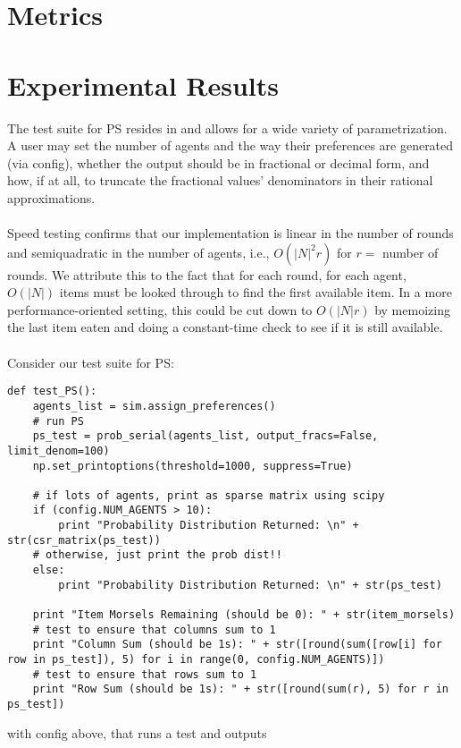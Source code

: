 \documentclass[12pt]{article}
\begin{document}
\section*{Metrics}
\section*{Experimental Results}

The test suite for PS resides in  and allows for a wide variety of parametrization. A user may set the number of agents and the way their preferences are generated (via config), whether the output should be in fractional or decimal form, and how, if at all, to truncate the fractional values' denominators in their rational approximations.\\\\Speed testing confirms that our implementation is linear in the number of rounds and semiquadratic in the number of agents, i.e., $O(|N|^2r)$ for $r=$ number of rounds. We attribute this to the fact that for each round, for each agent, $O(|N|)$ items must be looked through to find the first available item. In a more performance-oriented setting, this could be cut down to $O(|N|r)$ by memoizing the last item eaten and doing a constant-time check to see if it is still available.\\\\Consider our test suite for PS:
\begin{verbatim}
def test_PS():
    agents_list = sim.assign_preferences()
    # run PS
    ps_test = prob_serial(agents_list, output_fracs=False, limit_denom=100)
    np.set_printoptions(threshold=1000, suppress=True)

    # if lots of agents, print as sparse matrix using scipy
    if (config.NUM_AGENTS > 10):
        print "Probability Distribution Returned: \n" + str(csr_matrix(ps_test))
    # otherwise, just print the prob dist!!
    else:
        print "Probability Distribution Returned: \n" + str(ps_test)

    print "Item Morsels Remaining (should be 0): " + str(item_morsels)
    # test to ensure that columns sum to 1
    print "Column Sum (should be 1s): " + str([round(sum([row[i] for row in ps_test]), 5) for i in range(0, config.NUM_AGENTS)])
    # test to ensure that rows sum to 1
    print "Row Sum (should be 1s): " + str([round(sum(r), 5) for r in ps_test])

\end{verbatim}
\noindent with config above, that runs a test and outputs
\end{document}

